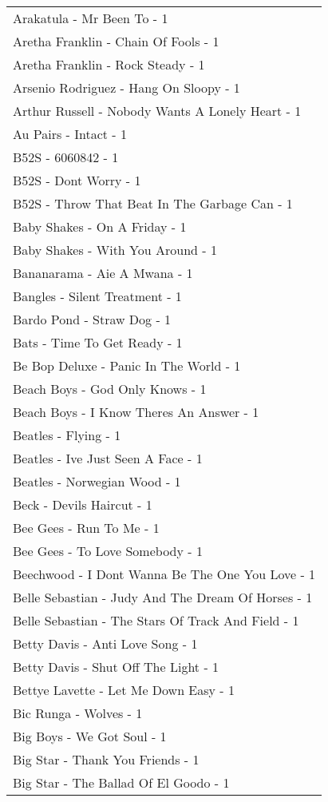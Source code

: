 \documentclass[
]{article}
\begin{document}
\begin{longtable}{l}
Arakatula - Mr Been To - 1 \\ 
Aretha Franklin - Chain Of Fools - 1 \\ 
Aretha Franklin - Rock Steady - 1 \\ 
Arsenio Rodriguez - Hang On Sloopy - 1 \\ 
Arthur Russell - Nobody Wants A Lonely Heart - 1 \\ 
Au Pairs - Intact - 1 \\ 
B52S - 6060842 - 1 \\ 
B52S - Dont Worry - 1 \\ 
B52S - Throw That Beat In The Garbage Can - 1 \\ 
Baby Shakes - On A Friday - 1 \\ 
Baby Shakes - With You Around - 1 \\ 
Bananarama - Aie A Mwana - 1 \\ 
Bangles - Silent Treatment - 1 \\ 
Bardo Pond - Straw Dog - 1 \\ 
Bats - Time To Get Ready - 1 \\ 
Be Bop Deluxe - Panic In The World - 1 \\ 
Beach Boys - God Only Knows - 1 \\ 
Beach Boys - I Know Theres An Answer - 1 \\ 
Beatles - Flying - 1 \\ 
Beatles - Ive Just Seen A Face - 1 \\ 
Beatles - Norwegian Wood - 1 \\ 
Beck - Devils Haircut - 1 \\ 
Bee Gees - Run To Me - 1 \\ 
Bee Gees - To Love Somebody - 1 \\ 
Beechwood - I Dont Wanna Be The One You Love - 1 \\ 
Belle Sebastian - Judy And The Dream Of Horses - 1 \\ 
Belle Sebastian - The Stars Of Track And Field - 1 \\ 
Betty Davis - Anti Love Song - 1 \\ 
Betty Davis - Shut Off The Light - 1 \\ 
Bettye Lavette - Let Me Down Easy - 1 \\ 
Bic Runga - Wolves - 1 \\ 
Big Boys - We Got Soul - 1 \\ 
Big Star - Thank You Friends - 1 \\ 
Big Star - The Ballad Of El Goodo - 1 \\ 

\end{longtable}
\end{document}
